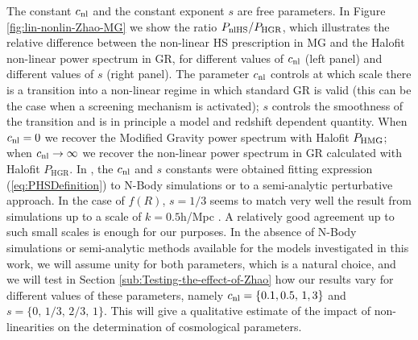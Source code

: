 The constant $c_{\mathrm{nl}}$ and the constant exponent $s$ are free parameters.
In Figure \ref{fig:lin-nonlin-Zhao-MG} we show the ratio $P_{\mathrm{nlHS}}/P_{\mathrm{HGR}}$,
which illustrates the relative difference between the non-linear HS prescription
in MG and the Halofit non-linear power spectrum in GR, for different
values of $c_{\mathrm{nl}}$ (left panel) and different values of $s$ (right
panel). The parameter $c_{\mathrm{nl}}$ controls at which scale there is a
transition into a non-linear regime in which standard GR is valid
(this can be the case when a screening mechanism is activated);
$s$ controls the smoothness of the transition and is in principle
a model and redshift dependent quantity. When $c_{\mathrm{nl}}=0$ we recover
the Modified Gravity power spectrum with Halofit $P_{\mathrm{HMG}}$; when
$c_{\mathrm{nl}}\rightarrow\infty$ we recover the non-linear power spectrum
in GR calculated with Halofit $P_{\mathrm{HGR}}$. In
\cite{zhao_modeling_2014,zhao_n-body_2011,koyama_non-linear_2009},
the $c_{\mathrm{nl}}$ and $s$ constants were obtained fitting expression (\ref{eq:PHSDefinition}) to N-Body
simulations or to a semi-analytic perturbative approach. In the case
of $f(R)$, $s=1/3$ seems to match very well the result from simulations
up to a scale of $k=0.5$h/Mpc \cite{koyama_non-linear_2009}. A relatively
good agreement up to such small scales is enough for our purposes.
In the absence of N-Body simulations or semi-analytic methods available
for the models investigated in this work, we will assume unity for
both parameters, which is a natural choice, and we will test in Section \ref{sub:Testing-the-effect-of-Zhao}
how our results vary for different values of these parameters, namely
$c_{\mathrm{nl}}=\{0.1,0.5,\,1,3\}$ and $s=\{0,\,1/3,\,2/3,\,1\}$. This will
give a qualitative estimate of the impact of non-linearities on the
determination of cosmological parameters.

